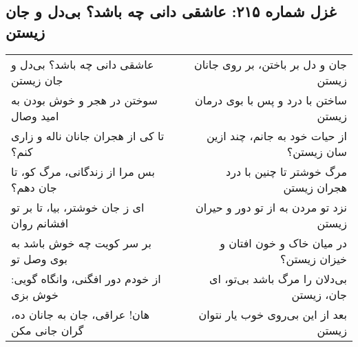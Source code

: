\begin{center}
\section*{غزل شماره ۲۱۵: عاشقی دانی چه باشد؟ بی‌دل و جان زیستن}
\label{sec:215}
\begin{longtable}{l p{0.5cm} r}
عاشقی دانی چه باشد؟ بی‌دل و جان زیستن
&&
جان و دل بر باختن، بر روی جانان زیستن
\\
سوختن در هجر و خوش بودن به امید وصال
&&
ساختن با درد و پس با بوی درمان زیستن
\\
تا کی از هجران جانان ناله و زاری کنم؟
&&
از حیات خود به جانم، چند ازین سان زیستن؟
\\
بس مرا از زندگانی، مرگ کو، تا جان دهم؟
&&
مرگ خوشتر تا چنین با درد هجران زیستن
\\
ای ز جان خوشتر، بیا، تا بر تو افشانم روان
&&
نزد تو مردن به از تو دور و حیران زیستن
\\
بر سر کویت چه خوش باشد به بوی وصل تو
&&
در میان خاک و خون افتان و خیزان زیستن؟
\\
از خودم دور افگنی، وانگاه گویی: خوش بزی
&&
بی‌دلان را مرگ باشد بی‌تو، ای جان، زیستن
\\
هان! عراقی، جان به جانان ده، گران جانی مکن
&&
بعد از این بی‌روی خوب یار نتوان زیستن
\\
\end{longtable}
\end{center}
